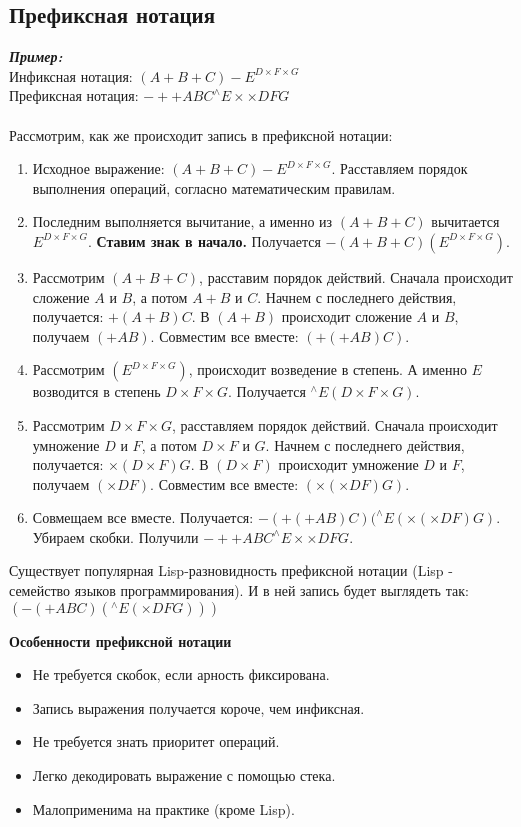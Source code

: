 \subsection{Префиксная нотация}
\textbf{\emph{Пример:}}
\\Инфиксная нотация: $(A + B + C) - E^{D\times F\times G}$
\\Префиксная нотация: $-++ABC^{\wedge}E\times\times DFG$
\\
\\Рассмотрим, как же происходит запись в префиксной нотации:
\begin{enumerate}
 \item Исходное выражение: $(A + B + C) - E^{D\times F\times G}$. Расставляем порядок выполнения операций, согласно математическим правилам.
\item Последним выполняется вычитание, а именно из $(A + B + C)$ вычитается $E^{D\times F\times G}$. \textbf{Ставим знак в начало.} Получается $-(A + B + C)(E^{D\times F\times G})$.
\item Рассмотрим $(A + B + C)$, расставим порядок действий. Сначала происходит сложение $A$ и $B$, а потом $A+B$ и $C$. Начнем с последнего действия, получается: $+(A+B)C$. В $(A+B)$ происходит сложение $A$ и $B$, получаем $(+AB)$. Совместим все вместе: $(+(+AB)C)$.
\item Рассмотрим $(E^{D\times F\times G})$, происходит возведение в степень. А именно $E$ возводится в степень $D\times F\times G$. Получается $^{\wedge}E(D\times F\times G)$.
\item Рассмотрим $D\times F\times G$, расставляем порядок действий. Сначала происходит умножение $D$ и $F$, а потом $D\times F$ и $G$. Начнем с последнего действия, получается: $\times(D \times F)G$. В $(D \times F)$ происходит умножение $D$ и $F$, получаем $(\times DF)$. Совместим все вместе: $(\times(\times DF)G)$.
\item Совмещаем все вместе. Получается: $-(+(+AB)C)(^{\wedge}E(\times(\times DF)G)$. Убираем скобки. Получили $-++ABC^{\wedge}E\times\times DFG$.
\end{enumerate}
Существует популярная Lisp-разновидность префиксной нотации (Lisp - семейство языков программирования). И в ней запись будет выглядеть так: $(-(+ABC)(^{\wedge}E(\times DFG)))$
\begin{center}
  \textbf{Особенности префиксной нотации}
\end{center}
\begin{itemize}
  \item Не требуется скобок, если арность фиксирована.
  \item Запись выражения получается короче, чем инфиксная.
  \item Не требуется знать приоритет операций.
  \item Легко декодировать выражение с помощью стека.
  \item Малоприменима на практике (кроме Lisp).
\end{itemize}
